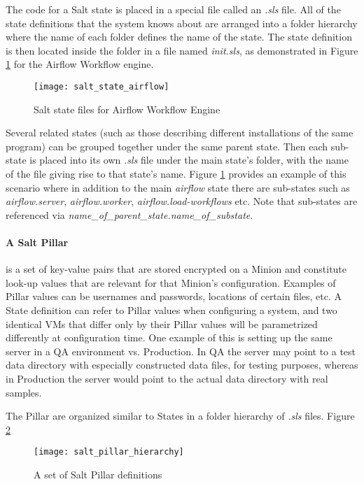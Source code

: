 The code for a Salt state is placed in a special file called an \emph{.sls} file. All of the state definitions that the system knows about are arranged into a folder hierarchy where the name of each folder defines the name of the state. The state definition is then located inside the folder in a file named \emph{init.sls}, as demonstrated in Figure \ref{fig:salt_state_airflow} for the Airflow Workflow engine.

\begin{figure}[H]
\texttt{[image: salt\_state\_airflow]}
\centering
\caption {Salt state files for Airflow Workflow Engine}
\label{fig:salt_state_airflow}
\end{figure}

Several related states (such as those describing different installations of the same program) can be grouped together under the same parent state. Then each sub-state is placed into its own \emph{.sls} file under the main state's folder, with the name of the file giving rise to that state's name. Figure \ref{fig:salt_state_airflow} provides an example of this scenario where in addition to the main \emph{airflow} state there are sub-states such as \emph{airflow.server}, \emph{airflow.worker}, \emph{airflow.load-workflows} etc. Note that sub-states are referenced via \emph{name\_of\_parent\_state.name\_of\_substate}.

\paragraph{A Salt Pillar} is a set of key-value pairs that are stored encrypted on a Minion and constitute look-up values that are relevant for that Minion's configuration. Examples of Pillar values can be usernames and passwords, locations of certain files, etc. A State definition can refer to Pillar values when configuring a system, and two identical VMs that differ only by their Pillar values will be parametrized differently at configuration time. One example of this is setting up the same server in a QA environment vs. Production. In QA the server may point to a test data directory with especially constructed data files, for testing purposes, whereas in Production the server would point to the actual data directory with real samples.

The Pillar are organized similar to States in a folder hierarchy of \emph{.sls} files. Figure \ref{fig:salt_pillar_hierarchy}

\begin{figure}[H]
\texttt{[image: salt\_pillar\_hierarchy]}
\centering
\caption {A set of Salt Pillar definitions}
\label{fig:salt_pillar_hierarchy}
\end{figure}

